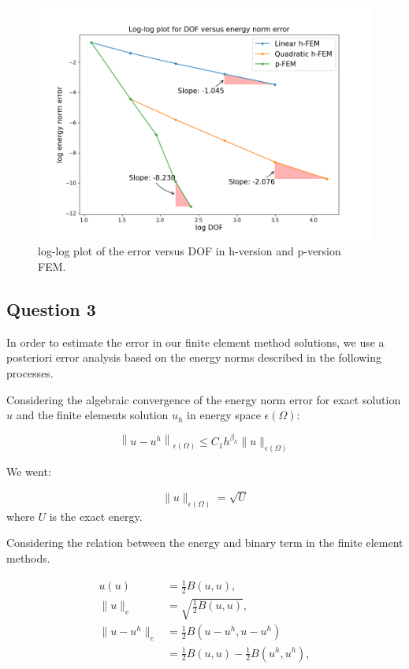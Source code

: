 \documentclass[twoside,twocolumn,10pt]{article}
\begin{document}
\begin{figure}[!ht]
  \centering
  \includegraphics[width=1.\linewidth]{Q1/h_p_error.png}
  \caption{ log-log plot of the error versus DOF in h-version and p-version FEM.}
  \label{fig:h_p_error}
\end{figure}

\subsection{Question 3}

In order to estimate the error in our finite element method solutions, we use a posteriori error analysis based on the energy norms described in the following processes.

Considering the algebraic convergence of the energy norm error for exact solution $u$ and the finite elements solution $u_h$ in energy space $\epsilon(\Omega)$:

\begin{equation}
  \left\|u-u^h\right\|_{\epsilon(\Omega)} \leqslant C_1 h^{\beta_h}\|u\|_{\epsilon(\Omega)}
\end{equation}

We went:

\begin{equation}
 \|u\|_{\epsilon(\Omega)} = \sqrt{U}
\end{equation}
where $U$ is the exact energy.

Considering the relation between the energy and binary term in the finite element methods.

\begin{equation}
  \begin{aligned}
  u(u) &= \frac{1}{2} B(u, u), \\
  \|u\|_e &= \sqrt{\frac{1}{2} B(u, u)}, \\
  \|u-u^h\|_e &= \frac{1}{2} B\left(u-u^h, u-u^h\right) \\
  &= \frac{1}{2} B(u, u) - \frac{1}{2} B\left(u^h, u^h\right), \\
\end{aligned}
\end{equation}
\end{document}
